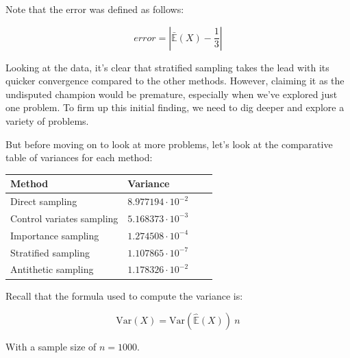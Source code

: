 \documentclass{article}
\begin{document}
Note that the error was defined as follows:	

\begin{equation*} error = | \bar{\mathbb{E}}(X) - \frac{1}{3} | \end{equation*}

Looking at the data, it’s clear that stratified sampling takes the lead with its quicker convergence compared to the other methods. However, claiming it as the undisputed champion would be premature, especially when we’ve explored just one problem. To firm up this initial finding, we need to dig deeper and explore a variety of problems.

But before moving on to look at more problems, let's look at the comparative table of variances for each method:

\begin{center}
	\begin{tabular}{ |p{5cm}||p{3cm}|p{3cm}|p{3cm}|  }
		\hline
		Method & Variance \\
		\hline
		\hline
		Direct sampling   			& \(8.977194 \cdot 10^{-2}\) \\
		\hline
		Control variates sampling 	& \(5.168373 \cdot 10^{-3}\) \\
		\hline
		Importance sampling      	& \(1.274508 \cdot 10^{-4}\) \\
		\hline
		Stratified sampling       	& \(1.107865 \cdot 10^{-7}\) \\
		\hline
		Antithetic sampling      	& \(1.178326 \cdot 10^{-2}\) \\
		\hline
	\end{tabular}
\end{center}

Recall that the formula used to compute the variance is:

\begin{equation*} \mathrm{Var}(X) = \mathrm{Var}(\hat{\mathbb{E}}(X)) \ n \end{equation*}

With a sample size of \(n = 1000\).
\end{document}
